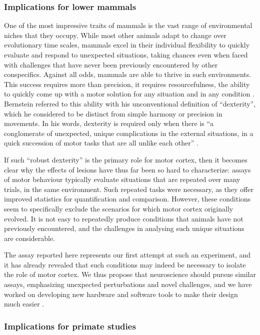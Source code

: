 \subsubsection*{Implications for lower mammals}

One of the most impressive traits of mammals is the vast range of environmental niches that they occupy. While most other animals adapt to change over evolutionary time scales, mammals excel in their individual flexibility to quickly evaluate and respond to unexpected situations, taking chances even when faced with challenges that have never been previously encountered by other conspecifics. Against all odds, mammals are able to thrive in such environments. This success requires more than precision, it requires resourcefulness, the ability to quickly come up with a motor solution for any situation and in any condition \cite{Bernstein1996}. Bernstein referred to this ability with his unconventional definition of ``dexterity'', which he considered to be distinct from simple harmony or precision in movements. In his words, dexterity is required only when there is \enquote{a conglomerate of unexpected, unique complications in the external situations, in a quick succession of motor tasks that are all unlike each other} \cite{Bernstein1996}.

If such ``robust dexterity'' is the primary role for motor cortex, then it becomes clear why the effects of lesions have thus far been so hard to characterize: assays of motor behaviour typically evaluate situations that are repeated over many trials, in the same environment. Such repeated tasks were necessary, as they offer improved statistics for quantification and comparison. However, these conditions seem to specifically exclude the scenarios for which motor cortex originally evolved. It is not easy to repeatedly produce conditions that animals have not previously encountered, and the challenges in analysing such unique situations are considerable.

The assay reported here represents our first attempt at such an experiment, and it has already revealed that such conditions may indeed be necessary to isolate the role of motor cortex. We thus propose that neuroscience should pursue similar assays, emphasizing unexpected perturbations and novel challenges, and we have worked on developing new hardware and software tools to make their design much easier \cite{Lopes2015a}.

\subsubsection*{Implications for primate studies}

